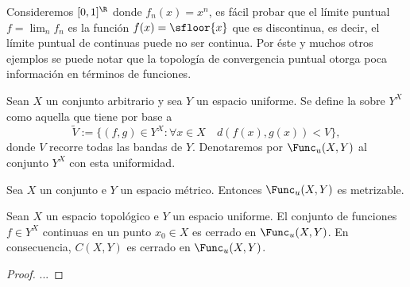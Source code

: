 \documentclass[topologia-analisis.tex]{subfiles}
\begin{document}
\begin{ex}
	Consideremos $[0,1]^\R$ donde $f_n(x) = x^n$, es fácil probar que el límite puntual $f = \lim_n f_n$ es la función $f(x) = \sfloor{x}$ que es discontinua,
	es decir, el límite puntual de continuas puede no ser continua.
	Por éste y muchos otros ejemplos se puede notar que la topología de convergencia puntual otorga poca información en términos de funciones.
\end{ex}

\begin{mydef}
	Sean $X$ un conjunto arbitrario y sea $Y$ un espacio uniforme.
	Se define la  sobre $Y^X$ como aquella que tiene por base a
	$$ \widetilde{V} := \{ (f, g) \in Y^X : \forall x\in X \quad d(f(x), g(x)) < V \}, $$
	donde $V$ recorre todas las bandas de $Y$.
	Denotaremos por $\Func_u(X, Y)$ al conjunto $Y^X$ con esta uniformidad.
\end{mydef}

\begin{prop}
	Sea $X$ un conjunto e $Y$ un espacio métrico.
	Entonces $\Func_u(X, Y)$ es metrizable.
\end{prop}

\begin{thmi}
	Sean $X$ un espacio topológico e $Y$ un espacio uniforme.
	El conjunto de funciones $f \in Y^X$ continuas en un punto $x_0 \in X$ es cerrado en $\Func_u(X, Y)$.
	En consecuencia, $C(X, Y)$ es cerrado en $\Func_u(X, Y)$.
\end{thmi}
\begin{proof}
	...
\end{proof}

\end{document}
